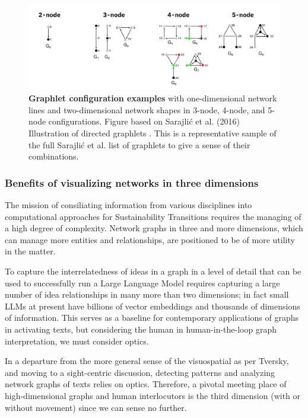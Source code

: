 \begin{figure}[h]
    \centering
    \includegraphics[width=\textwidth]{figures/f5.png}
    \caption[Graphlet configuration examples]{\textbf{Graphlet configuration examples} with one-dimensional network lines and two-dimensional network shapes in 3-node, 4-node, and 5-node configurations. Figure based on Sarajlić et al. (2016) Illustration of directed graphlets \citep[p. 3]{sarajlic_graphlet-based_2016}. This is a representative sample of the full Sarajlić et al. list of graphlets to give a sense of their combinations.}
    \label{fig:5}
\end{figure}
\FloatBarrier



\subsubsection{Benefits of visualizing networks in three dimensions}
The mission of consiliating information from various disciplines into computational approaches for Sustainability Transitions requires the managing of a high degree of complexity. Network graphs in three and more dimensions, which can manage more entities and relationships, are positioned to be of more utility in the matter. 

To capture the interrelatedness of ideas in a graph in a level of detail that can be used to successfully run a Large Language Model requires capturing a large number of idea relationships in many more than two dimensions; in fact small LLMs at present have billions of vector embeddings and thousands of dimensions of information. This serves as a baseline for contemporary applications of graphs in activating texts, but considering the human in human-in-the-loop graph interpretation, we must consider optics.

In a departure from the more general sense of the visuospatial as per Tversky, and moving to a sight-centric discussion, detecting patterns and analyzing network graphs of texts relies on optics. Therefore, a pivotal meeting place of high-dimensional graphs and human interlocutors is the third dimension (with or without movement) since we can sense no further.

